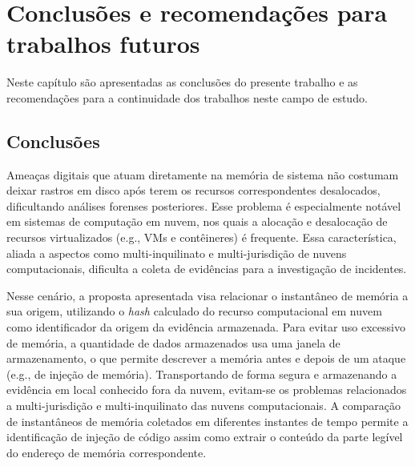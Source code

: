\chapter{Conclusões e recomendações para trabalhos futuros}
\label{sec:proposta-concl-recom}

%
Neste capítulo são apresentadas as conclusões do presente trabalho e as recomendações para a continuidade dos trabalhos neste campo de estudo.

\section{Conclusões}
\label{sec:proposta-concl}

%
Ameaças digitais que atuam diretamente na memória de sistema não costumam deixar rastros em disco após terem os recursos correspondentes desalocados, dificultando análises forenses posteriores.
%
Esse problema é especialmente notável em sistemas de computação em nuvem, nos quais a alocação e desalocação de recursos virtualizados (e.g., VMs e contêineres) é frequente.
%
Essa característica, aliada a aspectos como multi-inquilinato e multi-jurisdição de nuvens computacionais, dificulta a coleta de evidências para a investigação de incidentes.

%
Nesse cenário, a proposta apresentada visa relacionar o instantâneo de memória a sua origem, utilizando o \textit{hash} calculado do recurso computacional em nuvem como identificador da origem da evidência armazenada.
%
Para evitar uso excessivo de memória, a quantidade de dados armazenados usa uma janela de armazenamento, o que permite descrever a memória antes e depois de um ataque (e.g., de injeção de memória). 
%
Transportando de forma segura e armazenando a evidência em local conhecido fora da nuvem, evitam-se os problemas relacionados a multi-jurisdição e multi-inquilinato das nuvens computacionais.
%
A comparação de instantâneos de memória coletados em diferentes instantes de tempo permite a identificação de injeção de código assim como extrair o conteúdo da parte legível do endereço de memória correspondente.

